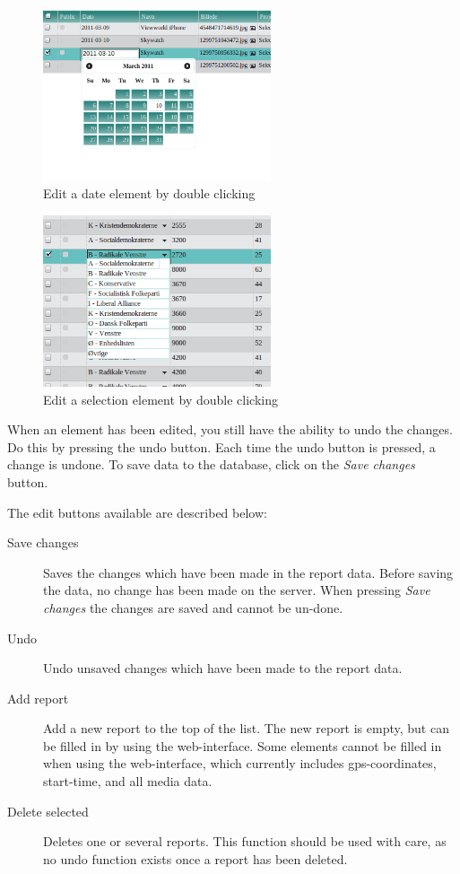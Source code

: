 \documentclass[a4paper, 12pt, final]{article}
\begin{document}
\begin{figure}[H]
  \centering
  \includegraphics[width=0.6\textwidth]{pics/web_edit_date.png}
  \caption{Edit a date element by double clicking}
  \label{fig:web_edit_date}
\end{figure}

\begin{figure}[H]
  \centering
  \includegraphics[width=0.6\textwidth]{pics/web_edit_select_one.png}
  \caption{Edit a selection element by double clicking}
  \label{fig:web_edit_select_one}
\end{figure}


When an element has been edited, you still have the ability to undo the changes. Do this by pressing the undo button. Each time the undo button is pressed, a change is undone. To save data to the database, click on the \emph{Save changes} button. 

The edit buttons available are described below:

\begin{description}
\item[Save changes] Saves the changes which have been made in the report data. Before saving the data, no change has been made on the server. When pressing \emph{Save changes} the changes are saved and cannot be un-done.
\item[Undo] Undo unsaved changes which have been made to the report data.
\item[Add report] Add a new report to the top of the list. The new report is empty, but can be filled in by using the web-interface. Some elements cannot be filled in when using the web-interface, which currently includes gps-coordinates, start-time, and all media data.
\item[Delete selected] Deletes one or several reports. This function should be used with care, as no undo function exists once a report has been deleted. 
\end{description}
\end{document}
